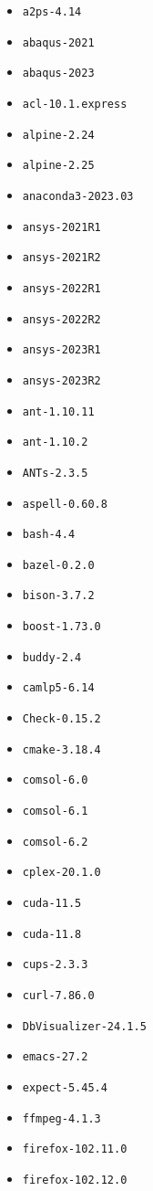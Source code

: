\begin{itemize}
\item \verb|a2ps-4.14|
\item \verb|abaqus-2021|
\item \verb|abaqus-2023|
\item \verb|acl-10.1.express|
\item \verb|alpine-2.24|
\item \verb|alpine-2.25|
\item \verb|anaconda3-2023.03|
\item \verb|ansys-2021R1|
\item \verb|ansys-2021R2|
\item \verb|ansys-2022R1|
\item \verb|ansys-2022R2|
\item \verb|ansys-2023R1|
\item \verb|ansys-2023R2|
\item \verb|ant-1.10.11|
\item \verb|ant-1.10.2|
\item \verb|ANTs-2.3.5|
\item \verb|aspell-0.60.8|
\item \verb|bash-4.4|
\item \verb|bazel-0.2.0|
\item \verb|bison-3.7.2|
\item \verb|boost-1.73.0|
\item \verb|buddy-2.4|
\item \verb|camlp5-6.14|
\item \verb|Check-0.15.2|
\item \verb|cmake-3.18.4|
\item \verb|comsol-6.0|
\item \verb|comsol-6.1|
\item \verb|comsol-6.2|
\item \verb|cplex-20.1.0|
\item \verb|cuda-11.5|
\item \verb|cuda-11.8|
\item \verb|cups-2.3.3|
\item \verb|curl-7.86.0|
\item \verb|DbVisualizer-24.1.5|
\item \verb|emacs-27.2|
\item \verb|expect-5.45.4|
\item \verb|ffmpeg-4.1.3|
\item \verb|firefox-102.11.0|
\item \verb|firefox-102.12.0|

\end{itemize}
